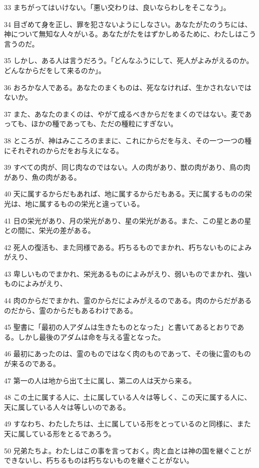 \par 33 まちがってはいけない。「悪い交わりは、良いならわしをそこなう」。
\par 34 目ざめて身を正し、罪を犯さないようにしなさい。あなたがたのうちには、神について無知な人々がいる。あなたがたをはずかしめるために、わたしはこう言うのだ。
\par 35 しかし、ある人は言うだろう。「どんなふうにして、死人がよみがえるのか。どんなからだをして来るのか」。
\par 36 おろかな人である。あなたのまくものは、死ななければ、生かされないではないか。
\par 37 また、あなたのまくのは、やがて成るべきからだをまくのではない。麦であっても、ほかの種であっても、ただの種粒にすぎない。
\par 38 ところが、神はみこころのままに、これにからだを与え、その一つ一つの種にそれぞれのからだをお与えになる。
\par 39 すべての肉が、同じ肉なのではない。人の肉があり、獣の肉があり、鳥の肉があり、魚の肉がある。
\par 40 天に属するからだもあれば、地に属するからだもある。天に属するものの栄光は、地に属するものの栄光と違っている。
\par 41 日の栄光があり、月の栄光があり、星の栄光がある。また、この星とあの星との間に、栄光の差がある。
\par 42 死人の復活も、また同様である。朽ちるものでまかれ、朽ちないものによみがえり、
\par 43 卑しいものでまかれ、栄光あるものによみがえり、弱いものでまかれ、強いものによみがえり、
\par 44 肉のからだでまかれ、霊のからだによみがえるのである。肉のからだがあるのだから、霊のからだもあるわけである。
\par 45 聖書に「最初の人アダムは生きたものとなった」と書いてあるとおりである。しかし最後のアダムは命を与える霊となった。
\par 46 最初にあったのは、霊のものではなく肉のものであって、その後に霊のものが来るのである。
\par 47 第一の人は地から出て土に属し、第二の人は天から来る。
\par 48 この土に属する人に、土に属している人々は等しく、この天に属する人に、天に属している人々は等しいのである。
\par 49 すなわち、わたしたちは、土に属している形をとっているのと同様に、また天に属している形をとるであろう。
\par 50 兄弟たちよ。わたしはこの事を言っておく。肉と血とは神の国を継ぐことができないし、朽ちるものは朽ちないものを継ぐことがない。
